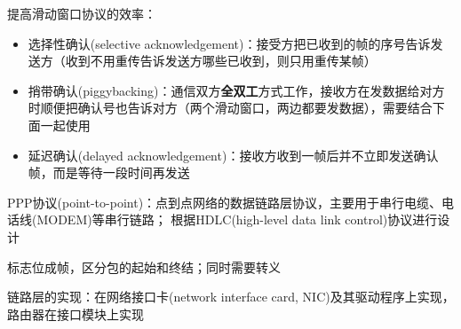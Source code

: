 
提高滑动窗口协议的效率：
\begin{itemize}
	\item 选择性确认(selective acknowledgement)：接受方把已收到的帧的序号告诉发送方（收到不用重传告诉发送方哪些已收到，则只用重传某帧）
	\item 捎带确认(piggybacking)：通信双方\textbf{全双工}方式工作，接收方在发数据给对方时顺便把确认号也告诉对方（两个滑动窗口，两边都要发数据），需要结合下面一起使用
	\item 延迟确认(delayed acknowledgement)：接收方收到一帧后并不立即发送确认帧，而是等待一段时间再发送
\end{itemize}

PPP协议(point-to-point)：点到点网络的数据链路层协议，主要用于串行电缆、电话线(MODEM)等串行链路；
根据HDLC(high-level data link control)协议进行设计

标志位成帧，区分包的起始和终结；同时需要转义

链路层的实现：在网络接口卡(network interface card, NIC)及其驱动程序上实现，路由器在接口模块上实现